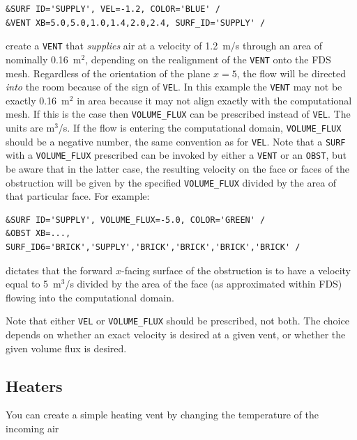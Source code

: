 \documentclass[11pt]{book}
\newcommand{\ct}{\tt\small}
\begin{document}
\footnotesize
\begin{verbatim}
&SURF ID='SUPPLY', VEL=-1.2, COLOR='BLUE' /
&VENT XB=5.0,5.0,1.0,1.4,2.0,2.4, SURF_ID='SUPPLY' /
\end{verbatim}
\normalsize

\noindent
create a {\ct VENT} that {\em supplies} air at a velocity of 1.2~m/s through an area of nominally 0.16~m$^2$, depending on the
realignment of the {\ct VENT} onto the FDS mesh. Regardless of the
orientation of the plane $x=5$, the flow will be directed {\em into} the room because of the sign of {\ct VEL}.
In this example the {\ct VENT} may not be exactly
0.16~m$^2$ in area because it may not align exactly with the computational mesh. If this is the case then
{\ct VOLUME\_FLUX} can be prescribed instead of {\ct VEL}. The units
are m$^3$/s. If the flow is entering the computational domain, {\ct VOLUME\_FLUX}
should be a negative number, the same convention as for {\ct VEL}. Note that a {\ct SURF}
with a {\ct VOLUME\_FLUX} prescribed can be invoked by either a
{\ct VENT} or an {\ct OBST}, but be aware that in the latter case, the resulting
velocity on the face or faces of the obstruction will be given by the specified
{\ct VOLUME\_FLUX} divided by the area of that particular face. For example:

\footnotesize
\begin{verbatim}
&SURF ID='SUPPLY', VOLUME_FLUX=-5.0, COLOR='GREEN' /
&OBST XB=..., SURF_ID6='BRICK','SUPPLY','BRICK','BRICK','BRICK','BRICK' /
\end{verbatim}
\normalsize

\noindent
dictates that the forward $x$-facing surface of the obstruction is to have a velocity
equal to 5~m$^3$/s divided by the area of the face (as approximated within FDS) flowing into the
computational domain.

\begin{warning}
\noindent
Note that either {\ct VEL} or {\ct VOLUME\_FLUX} should be prescribed,
not both.  The choice depends on whether an exact velocity is desired at a
given vent, or whether the given volume flux is desired.
\end{warning}


\subsection{Heaters}

You can create a simple heating vent by changing the temperature of the incoming air
\end{document}
